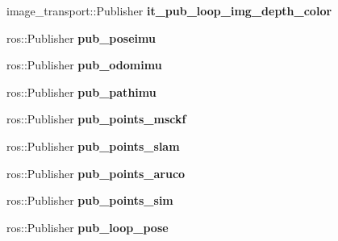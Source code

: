 \begin{DoxyCompactItemize}
\item 
\mbox{\label{classov__msckf_1_1ROS1Visualizer_a5c9da73f49d96b10fec862eb61b5a292}} 
image\+\_\+transport\+::\+Publisher {\bfseries it\+\_\+pub\+\_\+loop\+\_\+img\+\_\+depth\+\_\+color}
\item 
\mbox{\label{classov__msckf_1_1ROS1Visualizer_a00818d14efa4a0eb3b7fdbb95ce7114d}} 
ros\+::\+Publisher {\bfseries pub\+\_\+poseimu}
\item 
\mbox{\label{classov__msckf_1_1ROS1Visualizer_a3acd0320d7a1d4cb4d5dd2779f07dbc7}} 
ros\+::\+Publisher {\bfseries pub\+\_\+odomimu}
\item 
\mbox{\label{classov__msckf_1_1ROS1Visualizer_a16e653161ae4cad23b24edb878d0fee9}} 
ros\+::\+Publisher {\bfseries pub\+\_\+pathimu}
\item 
\mbox{\label{classov__msckf_1_1ROS1Visualizer_a721075e78fddf02c8de107acaed005ea}} 
ros\+::\+Publisher {\bfseries pub\+\_\+points\+\_\+msckf}
\item 
\mbox{\label{classov__msckf_1_1ROS1Visualizer_a000c69ea1344b2d38e9cb2e001595d40}} 
ros\+::\+Publisher {\bfseries pub\+\_\+points\+\_\+slam}
\item 
\mbox{\label{classov__msckf_1_1ROS1Visualizer_aa7e63e8962068795c6e89b2ab3bee0b2}} 
ros\+::\+Publisher {\bfseries pub\+\_\+points\+\_\+aruco}
\item 
\mbox{\label{classov__msckf_1_1ROS1Visualizer_ab8da3dacb4288d034d2748868bf53258}} 
ros\+::\+Publisher {\bfseries pub\+\_\+points\+\_\+sim}
\item 
\mbox{\label{classov__msckf_1_1ROS1Visualizer_a241608d1eb08d09cbb8273d68dbee0a0}} 
ros\+::\+Publisher {\bfseries pub\+\_\+loop\+\_\+pose}
\item 
\mbox{\label{classov__msckf_1_1ROS1Visualizer_ae6298b0902d6e4db42c3558565672303}} 

\end{DoxyCompactItemize}
